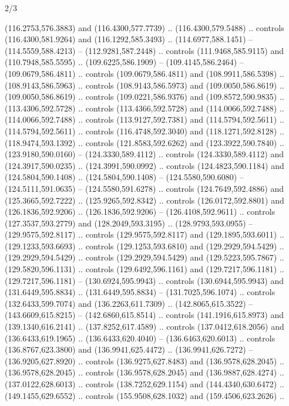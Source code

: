 \begin{flagdescription}{2/3}
\begin{scope}[xshift=0.5\flaglength,yshift=0.5\flagwidth,scale=\flagwidth/525.28]
\begin{scope}[y=0.1mm, x=0.1mm, yscale=-1,shift={(-381.5,-404)}]
\begin{scope}[shift={(5.25001,4.53053)},miter limit=4.00,line width=0.800\lw]
  (116.2753,576.3883) and (116.4300,577.7739) .. (116.4300,579.5488) .. controls
  (116.4300,581.9264) and (116.1292,585.3493) .. (114.6977,588.1451) --
  (114.5559,588.4213) -- (112.9281,587.2448) .. controls (111.9468,585.9115) and
  (110.7948,585.5595) .. (109.6225,586.1909) -- (109.4145,586.2464) --
  (109.0679,586.4811) .. controls (109.0679,586.4811) and (108.9911,586.5398) ..
  (108.9143,586.5963) .. controls (108.9143,586.5973) and (109.0050,586.8619) ..
  (109.0050,586.8619) .. controls (109.0221,586.9376) and (109.8572,590.9835) ..
  (113.4306,592.5728) .. controls (113.4366,592.5728) and (114.0066,592.7488) ..
  (114.0066,592.7488) .. controls (113.9127,592.7381) and (114.5794,592.5611) ..
  (114.5794,592.5611) .. controls (116.4748,592.3040) and (118.1271,592.8128) ..
  (118.9474,593.1392) .. controls (121.8583,592.6262) and (123.3922,590.7840) ..
  (123.9180,590.0160) -- (124.3330,589.4112) .. controls (124.3330,589.4112) and
  (124.3917,590.0235) .. (124.3991,590.0992) .. controls (124.4823,590.1184) and
  (124.5804,590.1408) .. (124.5804,590.1408) -- (124.5580,590.6080) --
  (124.5111,591.0635) -- (124.5580,591.6278) .. controls (124.7649,592.4886) and
  (125.3665,592.7222) .. (125.9265,592.8342) .. controls (126.0172,592.8801) and
  (126.1836,592.9206) .. (126.1836,592.9206) -- (126.4108,592.9611) .. controls
  (127.3537,593.2779) and (128.2049,593.3195) .. (128.9793,593.0955) --
  (129.9575,592.8117) .. controls (129.9575,592.8117) and (129.1895,593.6011) ..
  (129.1233,593.6693) .. controls (129.1253,593.6810) and (129.2929,594.5429) ..
  (129.2929,594.5429) .. controls (129.2929,594.5429) and (129.5223,595.7867) ..
  (129.5820,596.1131) .. controls (129.6492,596.1161) and (129.7217,596.1181) ..
  (129.7217,596.1181) -- (130.6924,595.9943) .. controls (130.6944,595.9943) and
  (131.6449,595.8834) .. (131.6449,595.8834) -- (131.7025,596.1074) .. controls
  (132.6433,599.7074) and (136.2263,611.7309) .. (142.8065,615.3522) --
  (143.6609,615.8215) -- (142.6860,615.8514) .. controls (141.1916,615.8973) and
  (139.1340,616.2141) .. (137.8252,617.4589) .. controls (137.0412,618.2056) and
  (136.6433,619.1965) .. (136.6433,620.4040) -- (136.6463,620.6013) .. controls
  (136.8767,623.3800) and (136.9941,625.4472) .. (136.9941,626.7272) --
  (136.9205,627.8920) .. controls (136.9275,627.8483) and (136.9578,628.2045) ..
  (136.9578,628.2045) .. controls (136.9578,628.2045) and (136.9887,628.4274) ..
  (137.0122,628.6013) .. controls (138.7252,629.1154) and (144.4340,630.6472) ..
  (149.1455,629.6552) .. controls (155.9508,628.1032) and (159.4506,623.2626) ..

\end{scope}
\end{scope}
\end{scope}
\end{flagdescription}
